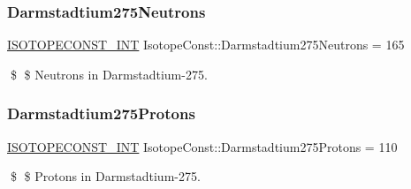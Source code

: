 \subsubsection{\texorpdfstring{Darmstadtium275\+Neutrons}{Darmstadtium275Neutrons}}
{\footnotesize\ttfamily \mbox{\hyperlink{group___isotope_const-_macros_ga5f18360b3e99483a35c32d789e62621c}{I\+S\+O\+T\+O\+P\+E\+C\+O\+N\+S\+T\+\_\+\+I\+NT}} Isotope\+Const\+::\+Darmstadtium275\+Neutrons = 165}

\$ \$ Neutrons in Darmstadtium-\/275. \mbox{\label{group___isotope_const-_darmstadtium-_ds275_gaa976287499e2f35b4fc717db7f9c6325}} 
\subsubsection{\texorpdfstring{Darmstadtium275\+Protons}{Darmstadtium275Protons}}
{\footnotesize\ttfamily \mbox{\hyperlink{group___isotope_const-_macros_ga5f18360b3e99483a35c32d789e62621c}{I\+S\+O\+T\+O\+P\+E\+C\+O\+N\+S\+T\+\_\+\+I\+NT}} Isotope\+Const\+::\+Darmstadtium275\+Protons = 110}

\$ \$ Protons in Darmstadtium-\/275. 